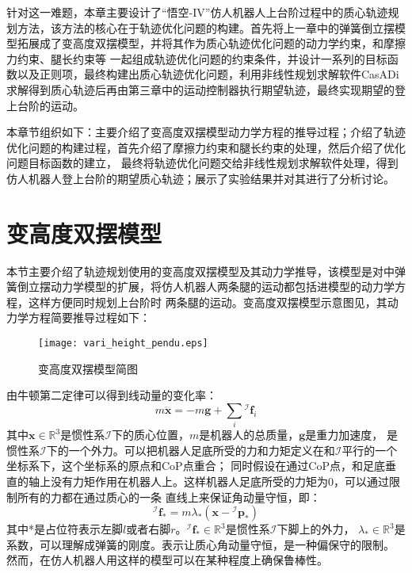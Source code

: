 针对这一难题，本章主要设计了“悟空-IV”仿人机器人上台阶过程中的质心轨迹规划方法，该方法的核心在于轨迹优化问题的构建。首先将上一章中的弹簧倒立摆模型拓展成了变高度双摆模型，并将其作为质心轨迹优化问题的动力学约束，和摩擦力约束、腿长约束等
一起组成轨迹优化问题的约束条件，并设计一系列的目标函数以及正则项，最终构建出质心轨迹优化问题，利用非线性规划求解软件CasADi\cite{andersson2019casadi}求解得到质心轨迹后再由第三章中的运动控制器执行期望轨迹，最终实现期望的登上台阶的运动。

本章节组织如下：主要介绍了变高度双摆模型动力学方程的推导过程；介绍了轨迹优化问题的构建过程，首先介绍了摩擦力约束和腿长约束的处理，然后介绍了优化问题目标函数的建立，
最终将轨迹优化问题交给非线性规划求解软件处理，得到仿人机器人登上台阶的期望质心轨迹；展示了实验结果并对其进行了分析讨论。
\section{变高度双摆模型}
\label{vari_height_pendu}
本节主要介绍了轨迹规划使用的变高度双摆模型及其动力学推导，该模型是对中弹簧倒立摆动力学模型的扩展，将仿人机器人两条腿的运动都包括进模型的动力学方程，这样方便同时规划上台阶时
两条腿的运动。变高度双摆模型示意图见，其动力学方程简要推导过程如下：
\begin{figure}[htbp]
    \centering
    \texttt{[image: vari\_height\_pendu.eps]}
    \caption{\label{fig:vari_height_pendu}变高度双摆模型简图}
\end{figure}
由牛顿第二定律可以得到线动量的变化率：
\begin{equation}
    \label{equ:newton_2}
    m \ddot{\boldsymbol{x}}=-m \boldsymbol{g}+\sum_i{ }^{\mathcal{I}} \boldsymbol{f}_i
\end{equation}
其中$\boldsymbol{x} \in \mathbb{R}^{3}$是惯性系$\mathcal{I}$下的质心位置，$m$是机器人的总质量，$\boldsymbol{g}$是重力加速度， 
是惯性系$\mathcal{I}$下的一个外力。可以把机器人足底所受的力和力矩定义在和$\mathcal{I}$平行的一个坐标系下，这个坐标系的原点和CoP点重合；
同时假设在通过CoP点，和足底垂直的轴上没有力矩作用在机器人上。这样机器人足底所受的力矩为0，可以通过限制所有的力都在通过质心的一条
直线上来保证角动量守恒，即：
\begin{equation}
    \label{equ:linear_f}
    { }^{\mathcal{I}} \boldsymbol{f}_*=m \lambda_*\left(\boldsymbol{x}-{ }^{\mathcal{I}} \boldsymbol{p}_*\right)
\end{equation}
其中*是占位符表示左脚$l$或者右脚$r$。${ }^{\mathcal{I}} \boldsymbol{f}_* \in \mathbb{R}^{3}$是惯性系$\mathcal{I}$下脚上的外力，
$\lambda_* \in \mathbb{R}^{3}$是系数，可以理解成弹簧的刚度。表示让质心角动量守恒，是一种偏保守的限制。
然而，在仿人机器人用这样的模型可以在某种程度上确保鲁棒性。

